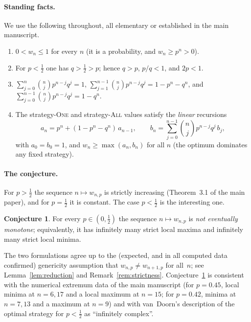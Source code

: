 \documentclass[11pt]{article}
\theoremstyle{definition}
\newtheorem{conjecture}[theorem]{Conjecture}
\newcommand{\One}{\textsc{One}}
\newcommand{\All}{\textsc{All}}
\begin{document}
\paragraph{Standing facts.} We use the following throughout, all
elementary or established in the main manuscript.
\begin{enumerate}[label=(F\arabic*),leftmargin=3.2em]
\item\label{f:bounds} $0<w_n\le 1$ for every $n$ (it is a probability,
  and $w_n\ge p^n>0$).
\item\label{f:pq} For $p<\tfrac12$ one has $q>\tfrac12>p$; hence
  $q>p$, $p/q<1$, and $2p<1$.
\item\label{f:binom} $\displaystyle\sum_{j=0}^{n}\binom nj p^{n-j}q^j=1$,
  $\displaystyle\sum_{j=1}^{n-1}\binom nj p^{n-j}q^j=1-p^n-q^n$, and
  $\displaystyle\sum_{j=0}^{n-1}\binom nj p^{n-j}q^j=1-q^n$.
\item\label{f:strat} The strategy-\One{} and strategy-\All{} values
  satisfy the \emph{linear} recursions
  \[
    a_n = p^n+(1-p^n-q^n)\,a_{n-1},\qquad
    b_n = \sum_{j=0}^{n-1}\binom nj p^{n-j}q^j\,b_j ,
  \]
  with $a_0=b_0=1$, and $w_n\ge\max(a_n,b_n)$ for all $n$ (the optimum
  dominates any fixed strategy).
\end{enumerate}

\paragraph{The conjecture.} For $p>\tfrac12$ the sequence $n\mapsto
w_{n,p}$ is strictly increasing (Theorem~3.1 of the main paper), and
for $p=\tfrac12$ it is constant. The case $p<\tfrac12$ is the
interesting one.

\begin{conjecture}\label{conj:main}
  For every $p\in(0,\tfrac12)$ the sequence $n\mapsto w_{n,p}$ is
  \emph{not eventually monotone}; equivalently, it has infinitely many
  strict local maxima and infinitely many strict local minima.
\end{conjecture}

The two formulations agree up to the (expected, and in all computed
data confirmed) genericity assumption that $w_{n,p}\ne w_{n+1,p}$ for
all~$n$; see Lemma~\ref{lem:reduction} and
Remark~\ref{rem:strictness}. Conjecture~\ref{conj:main} is consistent
with the numerical extremum data of the main manuscript (for $p=0.45$,
local minima at $n=6,17$ and a local maximum at $n=15$; for $p=0.42$,
minima at $n=7,13$ and a maximum at $n=9$) and with van~Doorn's
description of the optimal strategy for $p<\tfrac12$ as ``infinitely
complex''.
\end{document}
